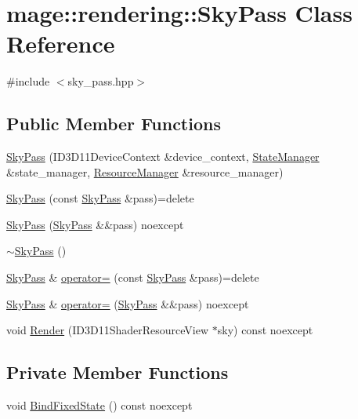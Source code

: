 \hypertarget{classmage_1_1rendering_1_1_sky_pass}{}\section{mage\+:\+:rendering\+:\+:Sky\+Pass Class Reference}
\label{classmage_1_1rendering_1_1_sky_pass}


{\ttfamily \#include $<$sky\+\_\+pass.\+hpp$>$}

\subsection*{Public Member Functions}
\begin{DoxyCompactItemize}
\item 
\hyperlink{classmage_1_1rendering_1_1_sky_pass_a55e8ef167a1e70a88a4be1fd11aed70e}{Sky\+Pass} (I\+D3\+D11\+Device\+Context \&device\+\_\+context, \hyperlink{classmage_1_1rendering_1_1_state_manager}{State\+Manager} \&state\+\_\+manager, \hyperlink{classmage_1_1rendering_1_1_resource_manager}{Resource\+Manager} \&resource\+\_\+manager)
\item 
\hyperlink{classmage_1_1rendering_1_1_sky_pass_a684fba31f92c43b717029d929303db2e}{Sky\+Pass} (const \hyperlink{classmage_1_1rendering_1_1_sky_pass}{Sky\+Pass} \&pass)=delete
\item 
\hyperlink{classmage_1_1rendering_1_1_sky_pass_a2d9489936058c463743bd437fb0cbb3e}{Sky\+Pass} (\hyperlink{classmage_1_1rendering_1_1_sky_pass}{Sky\+Pass} \&\&pass) noexcept
\item 
\hyperlink{classmage_1_1rendering_1_1_sky_pass_a99473ca11c0c25ab0608a3f93cf30aa6}{$\sim$\+Sky\+Pass} ()
\item 
\hyperlink{classmage_1_1rendering_1_1_sky_pass}{Sky\+Pass} \& \hyperlink{classmage_1_1rendering_1_1_sky_pass_a8364836c5db0dc3e9894e1749ab302e8}{operator=} (const \hyperlink{classmage_1_1rendering_1_1_sky_pass}{Sky\+Pass} \&pass)=delete
\item 
\hyperlink{classmage_1_1rendering_1_1_sky_pass}{Sky\+Pass} \& \hyperlink{classmage_1_1rendering_1_1_sky_pass_ad844a754a13fa90ef87aa62745ea936d}{operator=} (\hyperlink{classmage_1_1rendering_1_1_sky_pass}{Sky\+Pass} \&\&pass) noexcept
\item 
void \hyperlink{classmage_1_1rendering_1_1_sky_pass_a94b9ca7b1a02b6f6730584ec80adb84a}{Render} (I\+D3\+D11\+Shader\+Resource\+View $\ast$sky) const noexcept
\end{DoxyCompactItemize}
\subsection*{Private Member Functions}
\begin{DoxyCompactItemize}
\item 
void \hyperlink{classmage_1_1rendering_1_1_sky_pass_ab2e7bf506b3a038264579aa3c494f14d}{Bind\+Fixed\+State} () const noexcept
\end{DoxyCompactItemize}
